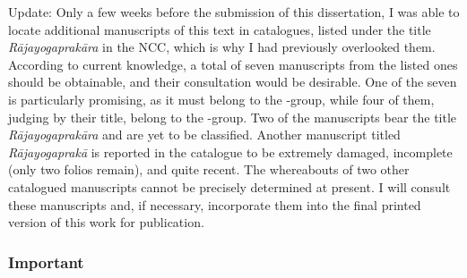 Update: Only a few weeks before the submission of this dissertation, I was able to locate additional manuscripts of this text in catalogues, listed under the title \textit{Rājayogaprakāra} in the NCC, which is why I had previously overlooked them. According to current knowledge, a total of seven manuscripts from the listed ones should be obtainable, and their consultation would be desirable. One of the seven is particularly promising, as it must belong to the \alpha-group, while four of them, judging by their title, belong to the \beta-group. Two of the manuscripts bear the title \textit{Rājayogaprakāra} and are yet to be classified. Another manuscript titled \textit{Rājayogaprakā} is reported in the catalogue to be extremely damaged, incomplete (only two folios remain), and quite recent. The whereabouts of two other catalogued manuscripts cannot be precisely determined at present. I will consult these manuscripts and, if necessary, incorporate them into the final printed version of this work for publication. 

\subsubsection{Important}

